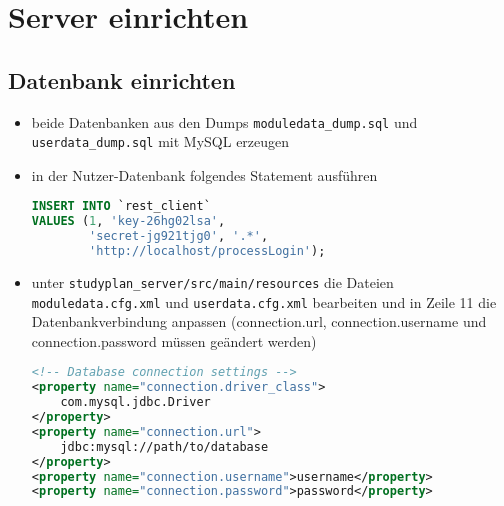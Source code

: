 \section{Server einrichten}
\subsection{Datenbank einrichten}
\begin{itemize}
	\item beide Datenbanken aus den Dumps \texttt{moduledata\_dump.sql} und \texttt{userdata\_dump.sql} mit MySQL erzeugen
	\item in der Nutzer-Datenbank folgendes Statement ausführen \\
	\begin{lstlisting}[language=SQL, tabsize=2]
INSERT INTO `rest_client` 
VALUES (1, 'key-26hg02lsa',
		'secret-jg921tjg0', '.*',
		'http://localhost/processLogin');
	\end{lstlisting}
	\item unter \texttt{studyplan\_server/src/main/resources} die Dateien \texttt{moduledata.cfg.xml} und \texttt{userdata.cfg.xml} bearbeiten und in Zeile 11 die Datenbankverbindung anpassen (connection.url, connection.username und connection.password müssen geändert werden)
	\begin{lstlisting}[language=XML, tabsize=2, frame = single, caption={Auszug aus *data.cfg.xml}, captionpos=b]
<!-- Database connection settings -->
<property name="connection.driver_class">
	com.mysql.jdbc.Driver
</property>
<property name="connection.url">
	jdbc:mysql://path/to/database
</property>
<property name="connection.username">username</property>
<property name="connection.password">password</property>
	\end{lstlisting}
\end{itemize}
